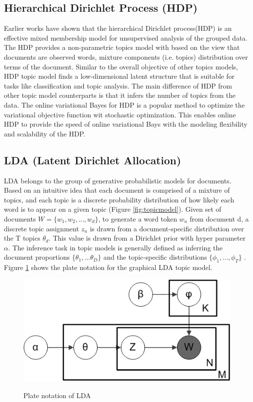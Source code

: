 \subsection{Hierarchical Dirichlet Process (HDP)}
Earlier works have shown that the hierarchical Dirichlet process(HDP) is an effective mixed membership model for unsupervised analysis of the grouped data\cite{WhyeTeh2006}. The HDP provides a non-parametric topics model with based on the view that documents are observed words, mixture components (i.e. topics) distribution over terms of the document. Similar to the overall objective of other topics models, HDP topic model finds a low-dimensional latent structure that is suitable for tasks like classification and topic analysis. The main difference of HDP from other topic model counterparts is that it infers the number of topics from the data. The online variational Bayes for HDP \cite{pmlr-v15-wang11a} is a popular method to optimize the variational objective function wit stochastic optimization. This enables online HDP to provide the speed of online variational Bays with the modeling flexibility and scalability of the HDP.


\subsection{LDA (Latent Dirichlet Allocation)}
LDA belongs to the group of generative probabilistic models for documents. Based on an intuitive idea that each document is comprised of a mixture of topics, and each topic is a discrete probability distribution of how likely each word is to appear on a given topic (Figure \ref{fig:topicmodel}). Given set of documents $W = \{w_1, w_2, ...,  w_d\}$, to generate a word token $w_n$  from document d, a discrete topic assignment $z_n$ is drawn from a document-specific distribution over the T topics $\theta_d$. This value is drawn from a Dirichlet prior with hyper parameter $\alpha$. The inference task in topic models is generally defined as inferring the document proportions $\{\theta_1, ... \theta_D\}$ and the topic-specific distributions $\{\phi_1, ... ,  \phi_T\}$ \cite{Mimno}. Figure \ref{fig:ldamodel} shows the plate notation for the graphical LDA topic model.


\begin{figure}[t]
\caption{Plate notation of LDA }
\includegraphics[scale=.5]{img/lda.png}
\centering
\label{fig:ldamodel}
\end{figure}

